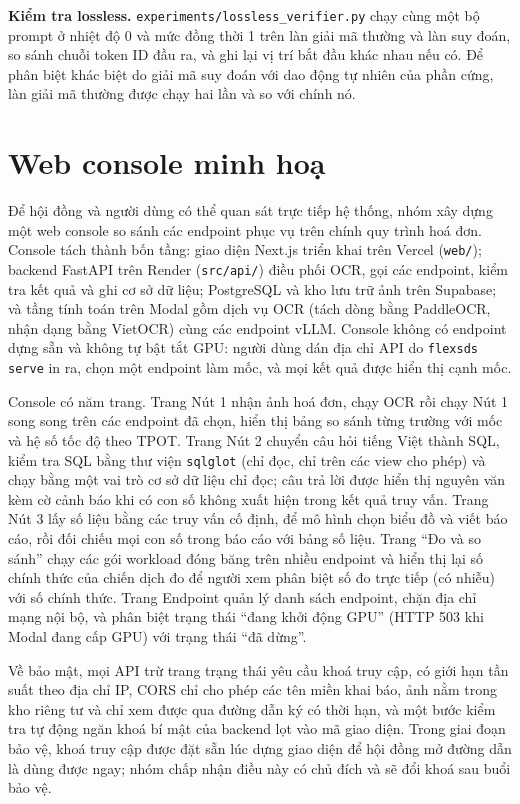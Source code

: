 \textbf{Kiểm tra lossless.} \texttt{experiments/lossless\_verifier.py} chạy cùng một bộ prompt ở nhiệt độ 0 và mức đồng thời 1 trên làn giải mã thường và làn suy đoán, so sánh chuỗi token ID đầu ra, và ghi lại vị trí bắt đầu khác nhau nếu có. Để phân biệt khác biệt do giải mã suy đoán với dao động tự nhiên của phần cứng, làn giải mã thường được chạy hai lần và so với chính nó.

\section{Web console minh hoạ}
\label{sec:ht-web}

Để hội đồng và người dùng có thể quan sát trực tiếp hệ thống, nhóm xây dựng một web console so sánh các endpoint phục vụ trên chính quy trình hoá đơn. Console tách thành bốn tầng: giao diện Next.js triển khai trên Vercel (\texttt{web/}); backend FastAPI trên Render (\texttt{src/api/}) điều phối OCR, gọi các endpoint, kiểm tra kết quả và ghi cơ sở dữ liệu; PostgreSQL và kho lưu trữ ảnh trên Supabase; và tầng tính toán trên Modal gồm dịch vụ OCR (tách dòng bằng PaddleOCR, nhận dạng bằng VietOCR) cùng các endpoint vLLM. Console không có endpoint dựng sẵn và không tự bật tắt GPU: người dùng dán địa chỉ API do \texttt{flexsds serve} in ra, chọn một endpoint làm mốc, và mọi kết quả được hiển thị cạnh mốc.

Console có năm trang. Trang Nút 1 nhận ảnh hoá đơn, chạy OCR rồi chạy Nút 1 song song trên các endpoint đã chọn, hiển thị bảng so sánh từng trường với mốc và hệ số tốc độ theo TPOT. Trang Nút 2 chuyển câu hỏi tiếng Việt thành SQL, kiểm tra SQL bằng thư viện \texttt{sqlglot} (chỉ đọc, chỉ trên các view cho phép) và chạy bằng một vai trò cơ sở dữ liệu chỉ đọc; câu trả lời được hiển thị nguyên văn kèm cờ cảnh báo khi có con số không xuất hiện trong kết quả truy vấn. Trang Nút 3 lấy số liệu bằng các truy vấn cố định, để mô hình chọn biểu đồ và viết báo cáo, rồi đối chiếu mọi con số trong báo cáo với bảng số liệu. Trang ``Đo và so sánh'' chạy các gói workload đóng băng trên nhiều endpoint và hiển thị lại số chính thức của chiến dịch đo để người xem phân biệt số đo trực tiếp (có nhiễu) với số chính thức. Trang Endpoint quản lý danh sách endpoint, chặn địa chỉ mạng nội bộ, và phân biệt trạng thái ``đang khởi động GPU'' (HTTP 503 khi Modal đang cấp GPU) với trạng thái ``đã dừng''.

Về bảo mật, mọi API trừ trang trạng thái yêu cầu khoá truy cập, có giới hạn tần suất theo địa chỉ IP, CORS chỉ cho phép các tên miền khai báo, ảnh nằm trong kho riêng tư và chỉ xem được qua đường dẫn ký có thời hạn, và một bước kiểm tra tự động ngăn khoá bí mật của backend lọt vào mã giao diện. Trong giai đoạn bảo vệ, khoá truy cập được đặt sẵn lúc dựng giao diện để hội đồng mở đường dẫn là dùng được ngay; nhóm chấp nhận điều này có chủ đích và sẽ đổi khoá sau buổi bảo vệ.

